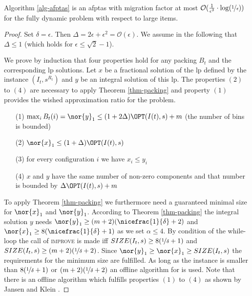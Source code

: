 \begin{theorem}
\label{thm-main}
Algorithm \ref{alg-afptas} is an \ac{afptas} with migration factor at most $\mathcal{O}(\frac{1}{\epsilon^3}\cdot \log(\nicefrac{1}{\epsilon}))$ for the fully dynamic \BP problem with respect to large items.
\end{theorem}

\begin{proof}
Set $\delta = \epsilon$. Then $\Delta = 2 \epsilon + \epsilon^2 = \mathcal{O}(\epsilon)$. We assume in the following that $\Delta \leq 1$ (which holds for $\epsilon\leq \sqrt{2}-1$).

We prove by induction that four properties hold for any packing $B_t$ and the corresponding \ac{lp} solutions. Let $x$ be a fractional solution of the \ac{lp} defined by the instance $(I_t,s^{R_{t}})$ and $y$ be an integral solution of this \ac{lp}.
    The properties $(2)$ to $(4)$ are necessary to apply Theorem \ref{thm-packing} and property $(1)$ provides the wished approximation ratio for the \BP problem.
	\begin{enumerate}
		\item[(1)\label{prop:1}] $\max_i B_t(i) = \nor{y}_1 \leq (1+ 2\Delta)\OPT(I(t),s) +m$ (the number of bins is bounded)
		\item[(2)\label{prop:2}] $\nor{x}_1  \leq (1+ \Delta) \OPT(I(t),s)$
		\item[(3)\label{prop:3}] for every configuration $i$ we have $x_i \leq y_i$
		\item[(4)\label{prop:4}] $x$ and $y$ have the same number of non-zero components and that number is bounded by $\Delta \OPT(I(t),s) +m$
	\end{enumerate}
	To apply Theorem \ref{thm-packing} we furthermore need a guaranteed minimal size for $\nor{x}_1$ and $\nor{y}_1$.
	According to Theorem \ref{thm-packing} the integral solution $y$ needs $\nor{y}_1 \geq (m+2)(\nicefrac{1}{\delta} +2)$ and 
	$\nor{x}_1 \geq 8 (\nicefrac{1}{\delta} +1)$ as we set $\alpha \leq 4$.
	By condition of the while-loop the call of \textsc{improve} is made iff $SIZE(I_t,s) \geq 8 (\nicefrac{1}{\delta} +1)$ and $SIZE(I_t,s) \geq (m+2)(\nicefrac{1}{\delta} +2)$. Since $\nor{y}_1 \geq \nor{x}_1 \geq SIZE(I_t,s)$ the requirements for the minimum size are fulfilled. As long as the instance is smaller than $8 (\nicefrac{1}{\delta} +1)$ or $(m+2)(\nicefrac{1}{\delta} +2)$ an offline algorithm for \BP is used. Note that there is an offline algorithm which fulfills properties $(1)$ to $(4)$ as shown by Jansen and Klein \cite{jansen2013binpacking}.
	

\end{proof}
